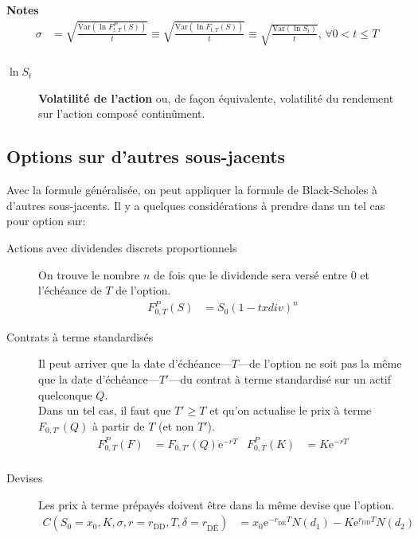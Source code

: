 \documentclass[10pt, french]{article}
\begin{document}
\begin{multicols*}{2}
\begin{definitionNOHFILL}
\tcbline
\textbf{Notes}
\begin{align*}
	\sigma
	&=	\sqrt{\frac{\text{Var}(\ln F^{P}_{t, T}(S))}{t}}	
	\equiv	\sqrt{\frac{\text{Var}(\ln F_{t, T}(S))}{t}}	
	\equiv	\sqrt{\frac{\text{Var}(\ln S_{t})}{t}}, \, \forall 0 < t \le T	\\
\end{align*}

\begin{description}
	\item[$\ln S_{t}$]	\textbf{Volatilité de l'action} ou, de façon équivalente, volatilité du rendement sur l'action composé continûment.
\end{description}
\end{definitionNOHFILL}

\subsection*{Options sur d'autres sous-jacents}

Avec la formule généralisée, on peut appliquer la formule de Black-Scholes à d'autres sous-jacents. Il y a quelques considérations à prendre dans un tel cas pour option sur:
\begin{description}
	\item[Actions avec dividendes discrets proportionnels]	On trouve le nombre $n$ de fois que le dividende sera versé entre $0$ et l'échéance de $T$ de l'option.
		\begin{align*}
		F^{P}_{0, T}(S)
		&=	S_{0} (1 - txdiv)^{n}
		\end{align*}
	\item[Contrats à terme standardisés]	Il peut arriver que la date d'échéance---$T$---de l'option ne soit pas la même que la date d'échéance---$T'$---du contrat à terme standardisé sur un actif quelconque $Q$. \\
			Dans un tel cas, il faut que $T' \ge T$ et qu'on actualise le prix à terme $F_{0, T'}(Q)$ à partir de $T$ (et non $T'$).
			\begin{align*}
			F^{P}_{0, T}(F)	
			&=	F_{0, T'}(Q) \textrm{e}^{-rT}	&
			F^{P}_{0, T}(K)
			&=	K \textrm{e}^{-rT}	\\
			\end{align*}
	\item[Devises]	Les prix à terme prépayés doivent être dans la même devise que l'option.
		\begin{align*}
		C(S_{0} = x_{0}, K, \sigma, r = r_{\text{DD}}, T, \delta = r_{\text{DÉ}})
		&=	x_{0} \textrm{e}^{-r_{\text{DÉ}} T}N(d_{1}) - K \textrm{e}^{r_{\text{DD}}T} N(d_{2})	
		\end{align*}
\end{description}


\end{multicols*}
\end{document}
